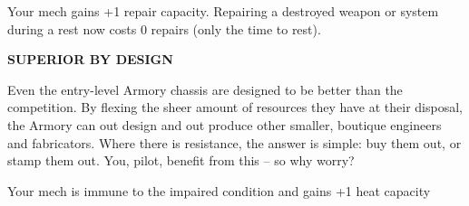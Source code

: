 Your mech gains +1 repair capacity. Repairing a destroyed weapon or system during a rest now costs 0 repairs (only the time to rest).


\textbf{SUPERIOR BY DESIGN}

Even the entry-level Armory chassis are designed to be better than the competition. By flexing the sheer amount of resources they have at their disposal, the Armory can out design and out produce other smaller, boutique engineers and fabricators. Where there is resistance, the answer is simple: buy them out, or stamp them out. You, pilot, benefit from this -- so why worry?

Your mech is immune to the impaired condition and gains +1 heat capacity
